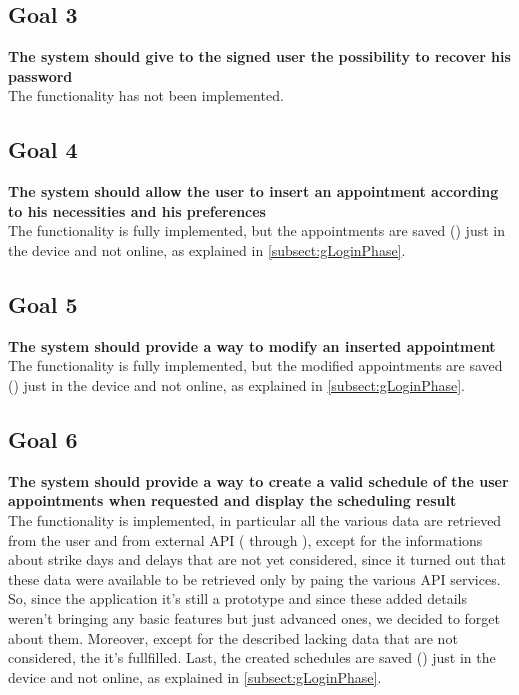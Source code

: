 \subsection{Goal 3} \label{subsect:gPasswordRecovery}
\textbf{The system should give to the signed user the possibility to recover his password} \\

The functionality has not been implemented.

\subsection{Goal 4} \label{subsect:gAppointmentCreation}
\textbf{The system should allow the user to insert an appointment according to his necessities and his preferences}\\

The functionality is fully implemented, but the appointments are saved () just in the device and not online, as explained in \ref{subsect:gLoginPhase}.

\subsection{Goal 5} \label{subsect:gAppointmentModification}
\textbf{The system should provide a way to modify an inserted appointment}\\

The functionality is fully implemented, but the modified appointments are saved () just in the device and not online, as explained in \ref{subsect:gLoginPhase}.

\subsection{Goal 6}
\label{subsect:gScheduleCreation}
\textbf{The system should provide a way to create a valid schedule of the user appointments when requested and display the scheduling result}\\

The functionality is implemented, in particular all the various data are retrieved from the user and from external API ( through ), except for the informations about strike days and delays that are not yet considered, since it turned out that these data were available to be retrieved only by paing the various API services. So, since the application it's still a prototype and since these added details weren't bringing any basic features but just advanced ones, we decided to forget about them. Moreover, except for the described lacking data that are not considered, the  it's fullfilled. Last, the created schedules are saved () just in the device and not online, as explained in \ref{subsect:gLoginPhase}.

